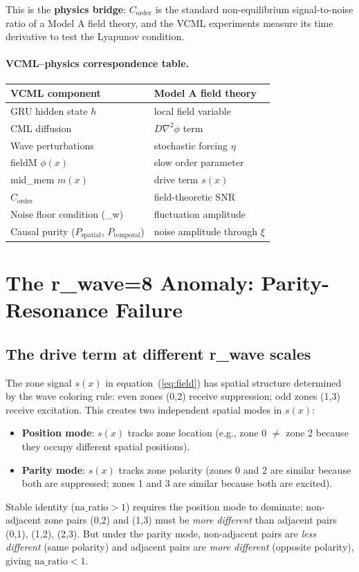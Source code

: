 \documentclass[11pt,a4paper]{article}
\newcommand{\Corder}{C_{\mathrm{order}}}
\newcommand{\sw}{\sigma_w}
\newcommand{\na}{\mathrm{na\_ratio}}
\newcommand{\Psp}{P_{\mathrm{spatial}}}
\newcommand{\Ptemp}{P_{\mathrm{temporal}}}
\begin{document}
This is the \textbf{physics bridge}: $\Corder$ is the standard non-equilibrium
signal-to-noise ratio of a Model A field theory, and the VCML experiments
measure its time derivative to test the Lyapunov condition.

\paragraph{VCML--physics correspondence table.}
\begin{center}
\begin{tabular}{ll}
\toprule
VCML component & Model A field theory \\
\midrule
GRU hidden state $h$ & local field variable \\
CML diffusion & $D\nabla^2\phi$ term \\
Wave perturbations & stochastic forcing $\eta$ \\
fieldM $\phi(x)$ & slow order parameter \\
mid\_mem $m(x)$ & drive term $s(x)$ \\
$\Corder$ & field-theoretic SNR \\
Noise floor condition (\sw) & fluctuation amplitude \\
Causal purity ($\Psp$, $\Ptemp$) & noise amplitude through $\xi$ \\
\bottomrule
\end{tabular}
\end{center}

\section{The r\_{wave}=8 Anomaly: Parity-Resonance Failure}

\subsection{The drive term at different r\_wave scales}

The zone signal $s(x)$ in equation~(\ref{eq:field}) has spatial structure determined
by the wave coloring rule: even zones (0,2) receive suppression; odd zones (1,3)
receive excitation.
This creates two independent spatial modes in $s(x)$:
\begin{itemize}
  \item \textbf{Position mode}: $s(x)$ tracks zone location
    (e.g., zone 0 $\neq$ zone 2 because they occupy different spatial positions).
  \item \textbf{Parity mode}: $s(x)$ tracks zone polarity
    (zones 0 and 2 are similar because both are suppressed;
    zones 1 and 3 are similar because both are excited).
\end{itemize}
Stable identity ($\na > 1$) requires the position mode to dominate:
non-adjacent zone pairs (0,2) and (1,3) must be \emph{more different} than
adjacent pairs (0,1), (1,2), (2,3).
But under the parity mode, non-adjacent pairs are \emph{less different}
(same polarity) and adjacent pairs are \emph{more different} (opposite polarity),
giving $\na < 1$.
\end{document}
